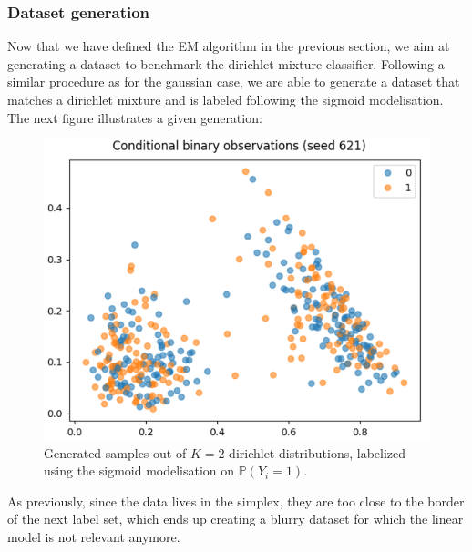 \subsubsection{Dataset generation}

Now that we have defined the EM algorithm in the previous section, we aim at generating a dataset to benchmark the dirichlet mixture classifier.
Following a similar procedure as for the gaussian case, we are able to generate a dataset that matches a dirichlet mixture and is labeled following the sigmoid modelisation.
The next figure illustrates a given generation:
\begin{figure}[H]
    \center
    \includegraphics[scale=0.7]{images/samples_dirichlet_lc}
    \caption{Generated samples out of $K=2$ dirichlet distributions, labelized using the sigmoid modelisation on $\mathbb{P}(Y_i = 1)$.}
    \label{fig:dirichlet_lc_badconditioning}
\end{figure}

As previously, since the data lives in the simplex, they are too close to the border of the next label set, which ends up creating a blurry dataset for which the
linear model is not relevant anymore.